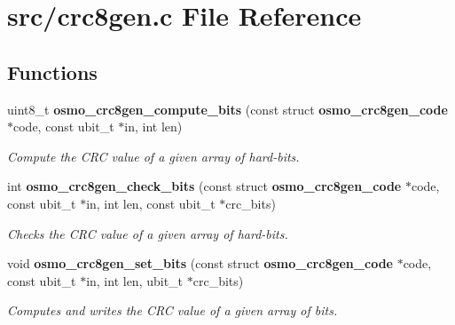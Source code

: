 \section{src/crc8gen.c File Reference}
\label{crc8gen_8c}
\subsection*{Functions}
\begin{DoxyCompactItemize}
\item 
uint8\+\_\+t \textbf{ osmo\+\_\+crc8gen\+\_\+compute\+\_\+bits} (const struct \textbf{ osmo\+\_\+crc8gen\+\_\+code} $\ast$code, const ubit\+\_\+t $\ast$in, int len)
\begin{DoxyCompactList}\small\item\em Compute the C\+RC value of a given array of hard-\/bits. \end{DoxyCompactList}\item 
int \textbf{ osmo\+\_\+crc8gen\+\_\+check\+\_\+bits} (const struct \textbf{ osmo\+\_\+crc8gen\+\_\+code} $\ast$code, const ubit\+\_\+t $\ast$in, int len, const ubit\+\_\+t $\ast$crc\+\_\+bits)
\begin{DoxyCompactList}\small\item\em Checks the C\+RC value of a given array of hard-\/bits. \end{DoxyCompactList}\item 
void \textbf{ osmo\+\_\+crc8gen\+\_\+set\+\_\+bits} (const struct \textbf{ osmo\+\_\+crc8gen\+\_\+code} $\ast$code, const ubit\+\_\+t $\ast$in, int len, ubit\+\_\+t $\ast$crc\+\_\+bits)
\begin{DoxyCompactList}\small\item\em Computes and writes the C\+RC value of a given array of bits. \end{DoxyCompactList}\end{DoxyCompactItemize}
